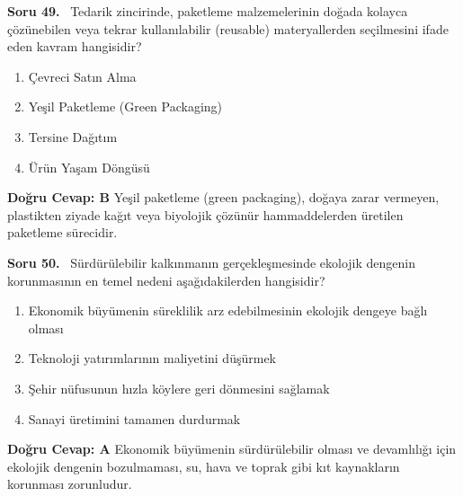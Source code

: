 \documentclass[11pt,a4paper,openany]{book}
\begin{document}
\needspace{5cm}
\vspace{8pt}
\noindent\textbf{\large\sffamily Soru 49.} \ Tedarik zincirinde, paketleme malzemelerinin doğada kolayca çözünebilen veya tekrar kullanılabilir (reusable) materyallerden seçilmesini ifade eden kavram hangisidir?
\begin{enumerate}[label=\Alph*), leftmargin=25pt, topsep=4pt, itemsep=2pt]
    \item Çevreci Satın Alma
    \item Yeşil Paketleme (Green Packaging)
    \item Tersine Dağıtım
    \item Ürün Yaşam Döngüsü
\end{enumerate}
\vspace{4pt}
\begin{tcolorbox}[title=Cevap ve Açıklama, colback=gray!3!white, colframe=primarycolor!90!black, arc=2mm, fonttitle=\bfseries\sffamily, top=6pt, bottom=6pt]
    \textbf{Doğru Cevap: B}
    \vspace{2pt}
    Yeşil paketleme (green packaging), doğaya zarar vermeyen, plastikten ziyade kağıt veya biyolojik çözünür hammaddelerden üretilen paketleme sürecidir.
\end{tcolorbox}
\vspace{10pt}

\needspace{5cm}
\vspace{8pt}
\noindent\textbf{\large\sffamily Soru 50.} \ Sürdürülebilir kalkınmanın gerçekleşmesinde ekolojik dengenin korunmasının en temel nedeni aşağıdakilerden hangisidir?
\begin{enumerate}[label=\Alph*), leftmargin=25pt, topsep=4pt, itemsep=2pt]
    \item Ekonomik büyümenin süreklilik arz edebilmesinin ekolojik dengeye bağlı olması
    \item Teknoloji yatırımlarının maliyetini düşürmek
    \item Şehir nüfusunun hızla köylere geri dönmesini sağlamak
    \item Sanayi üretimini tamamen durdurmak
\end{enumerate}
\vspace{4pt}
\begin{tcolorbox}[title=Cevap ve Açıklama, colback=gray!3!white, colframe=primarycolor!90!black, arc=2mm, fonttitle=\bfseries\sffamily, top=6pt, bottom=6pt]
    \textbf{Doğru Cevap: A}
    \vspace{2pt}
    Ekonomik büyümenin sürdürülebilir olması ve devamlılığı için ekolojik dengenin bozulmaması, su, hava ve toprak gibi kıt kaynakların korunması zorunludur.
\end{tcolorbox}
\vspace{10pt}
\end{document}
